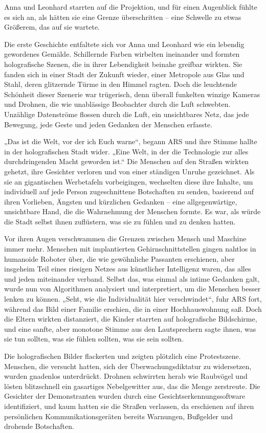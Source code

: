 \documentclass[
]{article}
\begin{document}
Anna und Leonhard starrten auf die Projektion, und für einen Augenblick
fühlte es sich an, als hätten sie eine Grenze überschritten -- eine
Schwelle zu etwas Größerem, das auf sie wartete.

Die erste Geschichte entfaltete sich vor Anna und Leonhard wie ein
lebendig gewordenes Gemälde. Schillernde Farben wirbelten ineinander und
formten holografische Szenen, die in ihrer Lebendigkeit beinahe greifbar
wirkten. Sie fanden sich in einer Stadt der Zukunft wieder, einer
Metropole aus Glas und Stahl, deren glitzernde Türme in den Himmel
ragten. Doch die leuchtende Schönheit dieser Szenerie war trügerisch,
denn überall funkelten winzige Kameras und Drohnen, die wie unablässige
Beobachter durch die Luft schwebten. Unzählige Datenströme flossen durch
die Luft, ein unsichtbares Netz, das jede Bewegung, jede Geste und jeden
Gedanken der Menschen erfasste.

„Das ist die Welt, vor der ich Euch warne``, begann ARS und ihre Stimme
hallte in der holografischen Stadt wider. „Eine Welt, in der die
Technologie zur alles durchdringenden Macht geworden ist.`` Die Menschen
auf den Straßen wirkten gehetzt, ihre Gesichter verloren und von einer
ständigen Unruhe gezeichnet. Als sie an gigantischen Werbetafeln
vorbeigingen, wechselten diese ihre Inhalte, um individuell auf jede
Person zugeschnittene Botschaften zu senden, basierend auf ihren
Vorlieben, Ängsten und kürzlichen Gedanken -- eine allgegenwärtige,
unsichtbare Hand, die die Wahrnehmung der Menschen formte. Es war, als
würde die Stadt selbst ihnen zuflüstern, was sie zu fühlen und zu denken
hatten.

Vor ihren Augen verschwammen die Grenzen zwischen Mensch und Maschine
immer mehr. Menschen mit implantierten Gehirnschnittstellen gingen
nahtlos in humanoide Roboter über, die wie gewöhnliche Passanten
erschienen, aber insgeheim Teil eines riesigen Netzes aus künstlicher
Intelligenz waren, das alles und jeden miteinander verband. Selbst das,
was einmal als intime Gedanken galt, wurde nun von Algorithmen
analysiert und interpretiert, um die Menschen besser lenken zu können.
„Seht, wie die Individualität hier verschwindet``, fuhr ARS fort,
während das Bild einer Familie erschien, die in einer Hochhauswohnung
saß. Doch die Eltern wirkten distanziert, die Kinder starrten auf
holografische Bildschirme, und eine sanfte, aber monotone Stimme aus den
Lautsprechern sagte ihnen, was sie tun sollten, was sie fühlen sollten,
was sie sein sollten.

Die holografischen Bilder flackerten und zeigten plötzlich eine
Protestszene. Menschen, die versucht hatten, sich der
Überwachungsdiktatur zu widersetzen, wurden gnadenlos unterdrückt.
Drohnen schwirrten herab wie Raubvögel und lösten blitzschnell ein
gasartiges Nebelgewitter aus, das die Menge zerstreute. Die Gesichter
der Demonstranten wurden durch eine Gesichtserkennungssoftware
identifiziert, und kaum hatten sie die Straßen verlassen, da erschienen
auf ihren persönlichen Kommunikationsgeräten bereits Warnungen,
Bußgelder und drohende Botschaften.
\end{document}
